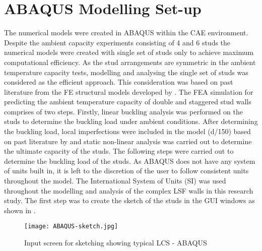 \section{ABAQUS Modelling Set-up}

The numerical models were created in ABAQUS within the CAE environment. Despite the ambient capacity experiments consisting of 4 and 6 studs the numerical models were created with single set of studs only to achieve maximum computational efficiency. As the stud arrangements are symmetric in the ambient temperature capacity tests, modelling and analysing the single set of studs was considered as the efficient approach. This consideration was based on past literature from the FE structural models developed by \citet{Shahbazian2011,Gunalan2013f,Kesawan2016a,Ariyanayagam2019}. The FEA simulation for predicting the ambient temperature capacity of double and staggered stud walls comprises of two steps. Firstly, linear buckling analysis was performed on the studs to determine the buckling load under ambient conditions. After determining the buckling load, local imperfections were included in the model (d/150) based on past literature by \citet{Gunalan2013f} and static non-linear analysis was carried out to determine the ultimate capacity of the studs. The following steps were carried out to determine the buckling load of the studs. As ABAQUS does not have any system of units built in, it is left to the discretion of the user to follow consistent units throughout the model. The International System of Units (SI) was used throughout the modelling and analysis of the complex LSF walls in this research study. The first step was to create the sketch of the studs in the GUI windows as shown in .
\begin{figure}[!htbp]
	\centering
			\texttt{[image: ABAQUS-sketch.jpg]}\\
		\caption{Input screen for sketching showing typical LCS - ABAQUS }
		\label{fig:ABAQUS-sketch}
\end{figure}


